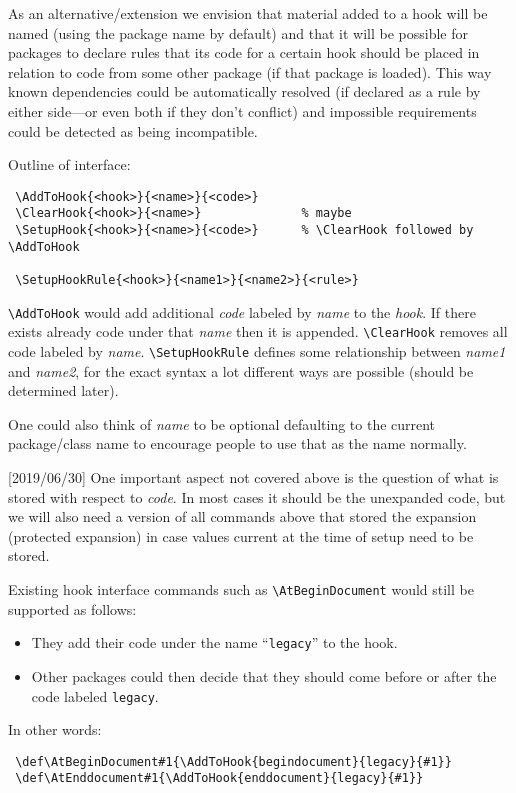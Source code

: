 \documentclass{article}
\newcounter{hook}
\newcommand\cs[1]{\texttt{\textbackslash #1}}
\renewcommand\arg[1]{\textit{#1}}      %
\begin{document}
As an alternative/extension we envision that material added to a hook
will be named (using the package name by default) and that it will be
possible for packages to declare rules that its code for a certain
hook should be placed in relation to code from some other package (if
that package is loaded). This way known dependencies could be
automatically resolved (if declared as a rule by either side---or even
both if they don't conflict) and impossible requirements could be
detected as being incompatible.

Outline of interface:
\begin{verbatim}
 \AddToHook{<hook>}{<name>}{<code>}
 \ClearHook{<hook>}{<name>}              % maybe
 \SetupHook{<hook>}{<name>}{<code>}      % \ClearHook followed by \AddToHook

 \SetupHookRule{<hook>}{<name1>}{<name2>}{<rule>}
\end{verbatim}

\cs{AddToHook} would add additional \arg{code} labeled by \arg{name}
to the \arg{hook}. If there exists already code under that \arg{name}
then it is appended.  \cs{ClearHook} removes all code labeled by
\arg{name}.  \cs{SetupHookRule} defines some relationship between
\arg{name1} and \arg{name2}, for the exact syntax a lot different ways
are possible (should be determined later).

One could also think of \arg{name} to be optional defaulting to the
current package/class name to encourage people to use that as the name
normally.

[2019/06/30] One important aspect not covered above is the question of
what is stored with respect to \arg{code}. In most cases it should be
the unexpanded code, but we will also need a version of all commands
above that stored the expansion (protected expansion) in case values
current at the time of setup need to be stored.


Existing hook interface commands such as \cs{AtBeginDocument} would
still be supported as follows:
\begin{itemize}
\item
  They add their code under the name ``\texttt{legacy}'' to the hook.
\item
  Other packages could then decide that they should come before or
  after the code labeled \texttt{legacy}.
\end{itemize}
In other words:
\begin{verbatim}
 \def\AtBeginDocument#1{\AddToHook{begindocument}{legacy}{#1}}
 \def\AtEnddocument#1{\AddToHook{enddocument}{legacy}{#1}}
\end{verbatim}
\end{document}
